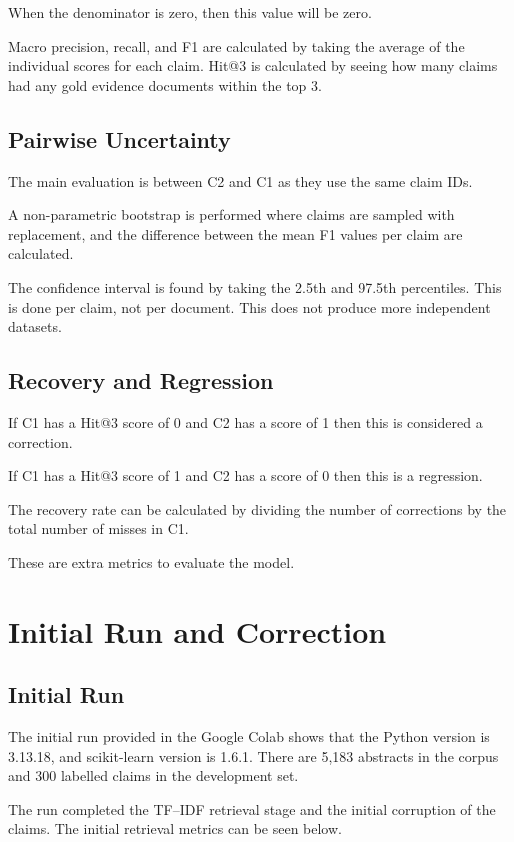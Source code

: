 \documentclass[11pt,a4paper]{article}
\begin{document}
When the denominator is zero, then this value will be zero.

Macro precision, recall, and F1 are calculated by taking the average of the individual scores for each claim. Hit@3 is calculated by seeing how many claims had any gold evidence documents within the top 3.

\subsection{Pairwise Uncertainty}

The main evaluation is between C2 and C1 as they use the same claim IDs.

A non-parametric bootstrap is performed where claims are sampled with replacement, and the difference between the mean F1 values per claim are calculated.

The confidence interval is found by taking the 2.5th and 97.5th percentiles. This is done per claim, not per document. This does not produce more independent datasets.

\subsection{Recovery and Regression}

If C1 has a Hit@3 score of 0 and C2 has a score of 1 then this is considered a correction.

If C1 has a Hit@3 score of 1 and C2 has a score of 0 then this is a regression.

The recovery rate can be calculated by dividing the number of corrections by the total number of misses in C1.

These are extra metrics to evaluate the model.

\section{Initial Run and Correction}

\subsection{Initial Run}

The initial run provided in the Google Colab shows that the Python version is 3.13.18, and scikit-learn version is 1.6.1. There are 5,183 abstracts in the corpus and 300 labelled claims in the development set.

The run completed the TF--IDF retrieval stage and the initial corruption of the claims. The initial retrieval metrics can be seen below.
\end{document}
